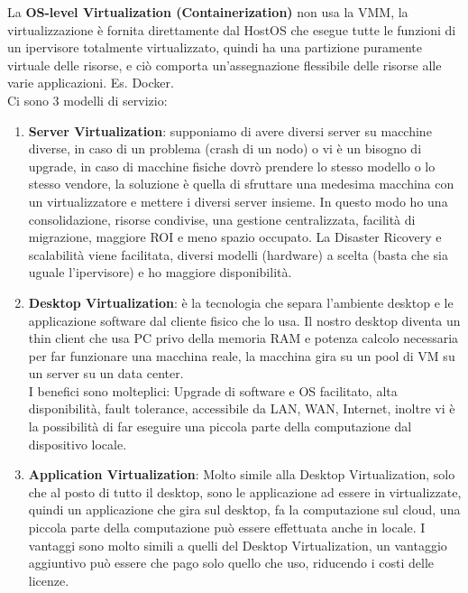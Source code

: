 \documentclass[11pt, twocolumn]{article}
\newenvironment{myenumerate}
{ \begin{enumerate}[topsep=0ex]
		\setlength{\itemsep}{0pt}
		\setlength{\parskip}{0pt}
		\setlength{\parsep}{0pt}     }
	{ \end{enumerate}                  }
\begin{document}
La \textbf{OS-level Virtualization (Containerization)} non usa la VMM, la virtualizzazione è fornita direttamente dal HostOS che esegue tutte le funzioni di un ipervisore totalmente virtualizzato, quindi ha una partizione puramente virtuale delle risorse, e ciò comporta un'assegnazione flessibile delle risorse alle varie applicazioni. Es. Docker.\\
Ci sono 3 modelli di servizio:
\begin{myenumerate}
	\item \textbf{Server Virtualization}: supponiamo di avere diversi server su macchine diverse, in caso di un problema (crash di un nodo) o vi è un bisogno di upgrade, in caso di macchine fisiche dovrò prendere lo stesso modello o lo stesso vendore, la soluzione è quella di sfruttare una medesima macchina con un virtualizzatore e mettere i diversi server insieme.
	In questo modo ho una consolidazione, risorse condivise, una gestione centralizzata, facilità di migrazione, maggiore ROI e meno spazio occupato.
	La Disaster Ricovery e scalabilità viene facilitata, diversi modelli (hardware) a scelta (basta che sia uguale l'ipervisore) e ho maggiore disponibilità.
	\item \textbf{Desktop Virtualization}: è la tecnologia che separa l'ambiente desktop e le applicazione software dal cliente fisico che lo usa. 
	Il nostro desktop diventa un thin client che usa PC privo della memoria RAM e potenza calcolo necessaria per far funzionare una macchina reale, la macchina gira su un pool di VM su un server su un data center.\\
	I benefici sono molteplici: Upgrade di software e OS facilitato, alta disponibilità, fault tolerance, accessibile da LAN, WAN, Internet, inoltre vi è la possibilità di far eseguire una piccola parte della computazione dal dispositivo locale.
	\item \textbf{Application Virtualization}: Molto simile alla Desktop Virtualization, solo che al posto di tutto il desktop, sono le applicazione ad essere in virtualizzate, quindi un applicazione che gira sul desktop, fa la computazione sul cloud, una piccola parte della computazione può essere effettuata anche in locale.
	I vantaggi sono molto simili a quelli del Desktop Virtualization, un vantaggio aggiuntivo può essere che pago solo quello che uso, riducendo i costi delle licenze.
\end{myenumerate}
\end{document}
